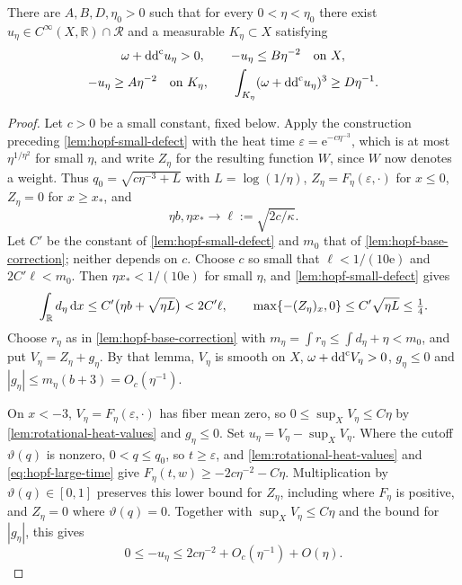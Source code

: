 \begin{theorem}\label{thm:rotational-depth-core}
There are $A,B,D,\eta_0>0$ such that for every $0<\eta<\eta_0$ there exist
$u_\eta\in C^\infty(X,\mathbb R)\cap\mathcal R$ and a measurable $K_\eta\subset X$ satisfying
\begin{gather*}
 \omega+\mathrm{dd}^{\mathrm{c}} u_\eta>0,
 \qquad -u_\eta\leq B\eta^{-2}\quad\text{on }X,\\
 -u_\eta\geq A\eta^{-2}\quad\text{on }K_\eta,
 \qquad
 \int_{K_\eta}(\omega+\mathrm{dd}^{\mathrm{c}} u_\eta)^3\geq D\eta^{-1}.
\end{gather*}
\end{theorem}
\begin{proof}
Let $c>0$ be a small constant, fixed below. Apply the construction preceding \cref{lem:hopf-small-defect} with the heat time $\varepsilon=\mathrm e^{-c\eta^{-3}}$, which is at most $\eta^{1/\eta^2}$ for small $\eta$, and write $Z_\eta$ for the resulting function $W$, since $W$ now denotes a weight. Thus $q_0=\sqrt{c\eta^{-3}+L}$ with $L=\log(1/\eta)$, $Z_\eta=F_\eta(\varepsilon,\cdot)$ for $x\leq0$, $Z_\eta=0$ for $x\geq x_*$, and
\[
 \eta b,\eta x_*\longrightarrow\ell:=\sqrt{2c/\kappa}.
\]
Let $C'$ be the constant of \cref{lem:hopf-small-defect} and $m_0$ that of \cref{lem:hopf-base-correction}; neither depends on $c$. Choose $c$ so small that $\ell<1/(10\mathrm e)$ and $2C'\ell<m_0$. Then $\eta x_*<1/(10\mathrm e)$ for small $\eta$, and \cref{lem:hopf-small-defect} gives
\begin{equation}\label{eq:rotational-integrated-defect}
 \int_\mathbb R d_\eta\,\mathrm dx\leq C'\bigl(\eta b+\sqrt{\eta L}\bigr)<2C'\ell,
 \qquad \max\{-(Z_\eta)_x,0\}\leq C'\sqrt{\eta L}\leq\tfrac14.
\end{equation}
Choose $r_\eta$ as in \cref{lem:hopf-base-correction} with $m_\eta=\int r_\eta\leq\int d_\eta+\eta<m_0$, and put $V_\eta=Z_\eta+g_\eta$. By that lemma, $V_\eta$ is smooth on $X$, $\omega+\mathrm{dd}^{\mathrm{c}} V_\eta>0$, $g_\eta\leq0$ and $|g_\eta|\leq m_\eta(b+3)=O_c(\eta^{-1})$.

On $x<-3$, $V_\eta=F_\eta(\varepsilon,\cdot)$ has fiber mean zero, so
$0\leq\sup_XV_\eta\leq C\eta$ by \cref{lem:rotational-heat-values} and $g_\eta\leq0$.
Set $u_\eta=V_\eta-\sup_XV_\eta$.
Where the cutoff $\vartheta(q)$ is nonzero, $0<q\leq q_0$, so $t\geq\varepsilon$, and \cref{lem:rotational-heat-values} and
\eqref{eq:hopf-large-time} give $F_\eta(t,w)\geq-2c\eta^{-2}-C\eta$.
Multiplication by $\vartheta(q)\in[0,1]$ preserves this lower bound
for $Z_\eta$, including where $F_\eta$ is positive, and $Z_\eta=0$ where $\vartheta(q)=0$. Together with
$\sup_XV_\eta\leq C\eta$ and the bound for $|g_\eta|$, this gives
\begin{equation}\label{eq:rotational-global-depth}
 0\leq-u_\eta\leq2c\eta^{-2}+O_c(\eta^{-1})+O(\eta).
\end{equation}


\end{proof}

